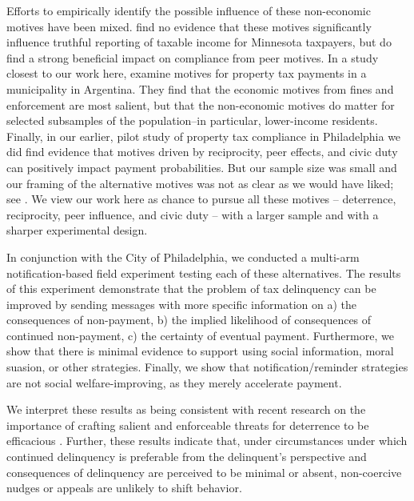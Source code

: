 \documentclass[12pt,titlepage]{article}
\begin{document}
Efforts to empirically identify the possible influence of these non-economic 
motives have been mixed.   \citet{blumenthal} find no evidence that 
these motives significantly influence truthful reporting of taxable income 
for Minnesota taxpayers, but \citet{hallsworth} do find a strong 
beneficial impact on compliance from peer motives.  In a study closest to 
our work here, \citet{castro} examine motives for property 
tax payments in a municipality in Argentina.  They find that the economic 
motives from fines and enforcement are most salient, but that the non-economic 
motives do matter for selected subsamples of the population--in particular, 
lower-income residents.   Finally, in our earlier, pilot study of property tax 
compliance in Philadelphia we did find evidence that motives driven by 
reciprocity, peer effects, and civic duty can positively impact payment 
probabilities. But our sample size was small and our framing of the 
alternative motives was not as clear as we would have liked; see 
\citet{chirico}.  We view our work here as chance to pursue all 
these motives – deterrence, reciprocity, peer influence, and civic duty – 
with a larger sample and with a sharper experimental design.     

In conjunction with the City of Philadelphia, we conducted a multi-arm 
notification-based field experiment testing each of these alternatives. The 
results of this experiment demonstrate that the problem of tax delinquency 
can be improved by sending messages with more specific information on
a) the consequences of non-payment, b) the implied likelihood of 
consequences of continued non-payment, c) the certainty of eventual 
payment. Furthermore, we show that there is minimal evidence to support 
using social information, moral suasion, or other strategies. Finally, 
we show that notification/reminder strategies are not social 
welfare-improving, as they merely accelerate payment. 


We interpret these results as being consistent with recent research 
on the importance of crafting salient and enforceable threats for 
deterrence to be efficacious \citep{hawken}. Further, these results indicate
that, under circumstances under which continued delinquency is preferable 
from the delinquent’s perspective and consequences of delinquency are 
perceived to be minimal or absent, non-coercive nudges or appeals are 
unlikely to shift behavior. 
\end{document}
